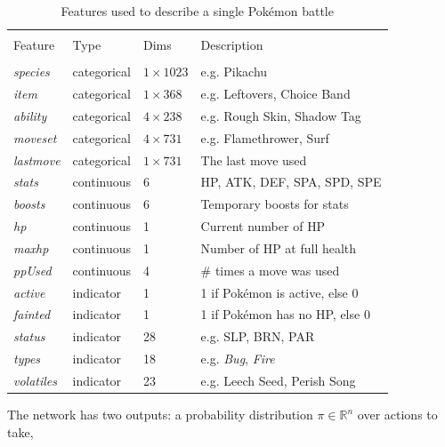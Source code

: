 \begin{table}[h]
\centering
    \begin{tabular}{llll}
    \hline \\
    Feature             & Type        & Dims            & Description                 \\
    \hline \\
    \emph{species}      & categorical & $1 \times 1023$ & e.g. Pikachu                \\
    \emph{item}         & categorical & $1 \times 368$  & e.g. Leftovers, Choice Band  \\
    \emph{ability}      & categorical & $4 \times 238$  & e.g. Rough Skin, Shadow Tag \\
    \emph{moveset}      & categorical & $4 \times 731$  & e.g. Flamethrower, Surf     \\
    \emph{lastmove}     & categorical & $1 \times 731$  & The last move used          \\
    \emph{stats}        & continuous  & 6               & \ac{HP}, \ac{ATK}, \ac{DEF}, \ac{SPA}, \ac{SPD}, \ac{SPE} \\
    \emph{boosts}       & continuous  & 6               & Temporary boosts for stats \\
    \emph{hp}           & continuous  & 1               & Current number of \ac{HP} \\
    \emph{maxhp}        & continuous  & 1               & Number of \ac{HP} at full health \\
    \emph{ppUsed}       & continuous  & 4               & \# times a move was used \\
    \emph{active}       & indicator   & 1               & 1 if Pokémon is active, else 0 \\
    \emph{fainted}      & indicator   & 1               & 1 if Pokémon has no \ac{HP}, else 0 \\
    \emph{status}       & indicator   & 28              & e.g. \ac{SLP}, \ac{BRN}, \ac{PAR} \\
    \emph{types}        & indicator   & 18              & e.g. \textit{Bug}, \textit{Fire} \\
    \emph{volatiles}    & indicator   & 23              & e.g. Leech Seed, Perish Song
    \end{tabular}
    \caption{Features used to describe a single Pokémon battle \cite{Huang_Lee_2019}}
    \label{tbl:HuangLee-Pokemon-Table}
\end{table}
The network has two outputs: a probability distribution $\pi \in \mathbb{R}^n$ over actions to take, 
